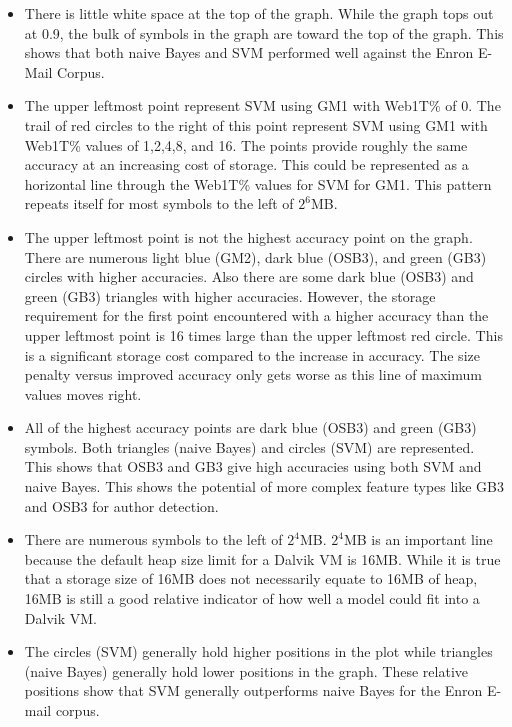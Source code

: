 	\begin{itemize}
		\item There is little white space at the top of the graph.  While the graph tops out at 0.9, the bulk of symbols in the graph are toward the top of the graph.  This shows that both naive Bayes and SVM performed well against the Enron E-Mail Corpus.
		\item The upper leftmost point represent SVM using GM1 with Web1T\% of 0.  The trail of red circles to the right of this point represent SVM using GM1 with Web1T\% values of 1,2,4,8, and 16.  The points provide roughly the same accuracy at an increasing cost of storage.  This could be represented as a horizontal line through the Web1T\% values for SVM for GM1.  This pattern repeats itself for most symbols to the left of $2^6$MB.
		\item The upper leftmost point is not the highest accuracy point on the graph.  There are numerous light blue (GM2), dark blue (OSB3), and green (GB3) circles with higher accuracies.  Also there are some dark blue (OSB3) and green (GB3) triangles with higher accuracies.  However, the storage requirement for the first point encountered with a higher accuracy than the upper leftmost point is 16 times large than the upper leftmost red circle.  This is a significant storage cost compared to the increase in accuracy.  The size penalty versus improved accuracy only gets worse as this line of maximum values moves right.
		\item All of the highest accuracy points are dark blue (OSB3) and green (GB3) symbols.  Both triangles (naive Bayes) and circles (SVM) are represented.  This shows that OSB3 and GB3 give high accuracies using both SVM and naive Bayes.  This shows the potential of more complex feature types like GB3 and OSB3 for author detection.
		\item There are numerous symbols to the left of $2^4$MB.  $2^4$MB is an important line because the default heap size limit for a Dalvik VM is 16MB.  While it is true that a storage size of 16MB does not necessarily equate to 16MB of heap, 16MB is still a good relative indicator of how well a model could fit into a Dalvik VM.
		\item The circles (SVM) generally hold higher positions in the plot while triangles (naive Bayes) generally hold lower positions in the graph. These relative positions show that SVM generally outperforms naive Bayes for the Enron E-mail corpus.

\end{itemize}
